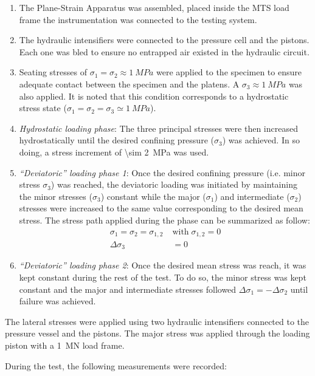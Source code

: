 \begin{enumerate}
    \item The Plane-Strain Apparatus was assembled, placed inside the MTS load frame the instrumentation was connected to the testing system.
    \item The hydraulic intensifiers were connected to the pressure cell and the pistons. Each one was bled to ensure no entrapped air existed in the hydraulic circuit. 
    \item Seating stresses of $\sigma_1 = \sigma_2 \approx \SI{1}{MPa}$ were applied to the specimen to ensure adequate contact between the specimen and the platens. A $\sigma_3 \approx \SI{1}{MPa}$ was also applied. It is noted that this condition corresponds to a hydrostatic stress state ($\sigma_1 = \sigma_2 = \sigma_3 \simeq \SI{1}{MPa}$).
    \item \emph{Hydrostatic loading phase}: The three principal stresses were then increased hydrostatically until the desired confining pressure ($\sigma_3$) was achieved. In so doing, a stress increment of \SI{\sim 2}{MPa} was used.
    \item \emph{“Deviatoric” loading phase 1}: Once the desired confining pressure (i.e. minor stress $\sigma_3$) was reached, the deviatoric loading was initiated by maintaining the minor stresses ($\sigma_3$) constant while the major ($\sigma_1$) and intermediate ($\sigma_2$) stresses were increased to the same value corresponding to the desired mean stress. The stress path applied during the phase can be summarized as follow:
    \begin{align}
        \sigma_1 = \sigma_2 = \sigma_{1,2} \; &\text{with} \; \sigma_{1,2} = 0\\
        \Delta\sigma_3 &= 0
    \end{align}
    \item \emph{“Deviatoric” loading phase 2}: Once the desired mean stress was reach, it was kept constant during the rest of the test. To do so, the minor stress was kept constant and the major and intermediate stresses followed $\Delta\sigma_1 = -\Delta\sigma_2$ until failure was achieved. 
\end{enumerate}

The lateral stresses were applied using two hydraulic intensifiers connected to the pressure vessel and the pistons. The major stress was applied through the loading piston with a \SI{1}{\mega\newton} load frame.

During the test, the following measurements were recorded: 

